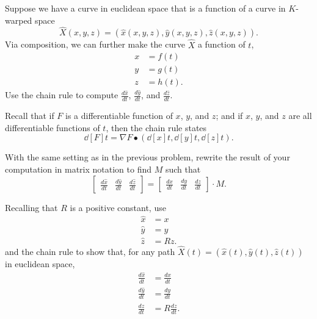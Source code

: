 \documentclass{ximera}
\begin{document}
\begin{problem}
  Suppose we have a curve in euclidean space that is a function of a
  curve in $K$-warped space
\[
\hat{X}(x,y,z)=\left(\hat{x}(x,y,z),\hat{y}(x,y,z),\hat{z}(x,y,z)  \right).
\]
Via composition, we can further make the curve $\hat{X}$ a function of $t$,
\begin{align*}
x &= f(t) \\
y &= g(t) \\
z &= h(t)  .
\end{align*}
Use the chain rule to compute $\frac{d\hat{x}}{dt}$,
$\frac{d\hat{y}}{dt}$, and $\frac{d\hat{z}}{dt}$.
\begin{hint}
  Recall that if $F$ is a differentiable function of $x$, $y$, and
  $z$; and if $x$, $y$, and $z$ are all differentiable functions of
  $t$, then the chain rule states
  \[
\dd[F]{t} = \nabla F \bullet\left(\dd[x]{t},\dd[y]{t},\dd[z]{t}\right).
  \]
\end{hint}
\end{problem}

\begin{problem}
  With the same setting as in the previous problem, rewrite the result
  of your computation in matrix notation to find $M$ such that
\[
\begin{bmatrix}
\frac{d\hat{x}}{dt} & \frac{d\hat{y}}{dt} & \frac{d\hat{z}}{dt}%
\end{bmatrix}
=
\begin{bmatrix}
\frac{dx}{dt} & \frac{dy}{dt} & \frac{dz}{dt}%
\end{bmatrix}\cdot M.
\]
\end{problem}

\begin{problem}
  \label{8} Recalling that $R$ is a positive constant, use
\begin{align*}
\hat{x}  &=x\\
\hat{y}  &=y\\
\hat{z}  &=Rz.
\end{align*}
and the chain rule to show that, for any path
$\hat{X}(t)=(\hat{x}(t),\hat{y}(t),\hat{z}(t))$ in euclidean space,%
\begin{align*}
\frac{d\hat{x}}{dt}  &  =\frac{dx}{dt}\\
\frac{d\hat{y}}{dt}  &  =\frac{dy}{dt}\\
\frac{d\hat{z}}{dt}  &  =R\frac{dz}{dt}.
\end{align*}
\end{problem}
\end{document}
